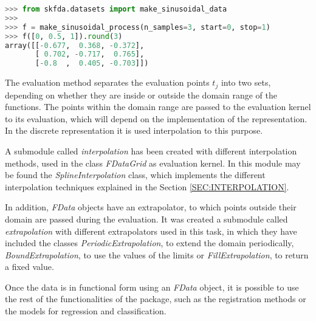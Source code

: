 \lstset{frame=lines}

\begin{lstlisting}[language=Python]
>>> from skfda.datasets import make_sinusoidal_data
>>>
>>> f = make_sinusoidal_process(n_samples=3, start=0, stop=1)
>>> f([0, 0.5, 1]).round(3)
array([[-0.677,  0.368, -0.372],
       [ 0.702, -0.717,  0.765],
       [-0.8  ,  0.405, -0.703]])
\end{lstlisting}



The evaluation method separates the evaluation points $t_j$ into two sets, depending on
whether they are inside or outside the domain range of the functions. The points
within the domain range are passed to the evaluation kernel to its evaluation,
which will depend  on the implementation of the representation. In the discrete
representation it is used interpolation to this purpose.

A submodule called \textit{interpolation} has been created with different
interpolation methods, used in the class \textit{FDataGrid} as evaluation kernel.
In this module may be found the \textit{SplineInterpolation} class,
which implements the different interpolation techniques explained in the
Section \ref{SEC:INTERPOLATION}.

In addition, \textit{FData} objects have an extrapolator, to which
points outside their domain are passed during the evaluation. It was created
a submodule called \textit{extrapolation} with different extrapolators used in
this task,
in which they have included the classes \textit{PeriodicExtrapolation}, to
extend the domain periodically, \textit{BoundExtrapolation}, to use the
values of the limits or \textit{FillExtrapolation}, to return a fixed value.

Once the data is in functional form using an \textit{FData} object,
it is possible to use the rest of the functionalities of the package, such as
the registration methods or the models for regression and classification.
